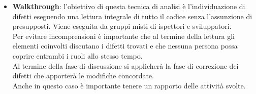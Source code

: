 {{\begin{itemize}
\begin{itemize}
			\item \textbf{Walkthrough}: l'obiettivo di questa tecnica di analisi è l'individuazione di difetti eseguendo una lettura integrale di tutto il codice senza l'assunzione di presupposti. Viene eseguita da gruppi misti di ispettori e sviluppatori. \\
			Per evitare incomprensioni è importante che al termine della lettura gli elementi coinvolti discutano i difetti trovati e che nessuna persona possa coprire entrambi i ruoli allo stesso tempo. \\
			Al termine della fase di discussione si applicherà la fase di correzione dei difetti che apporterà le modifiche concordate.  \\
			Anche in questo caso è importante tenere un rapporto delle attività svolte.
		\end{itemize}
		

\end{itemize}}}
